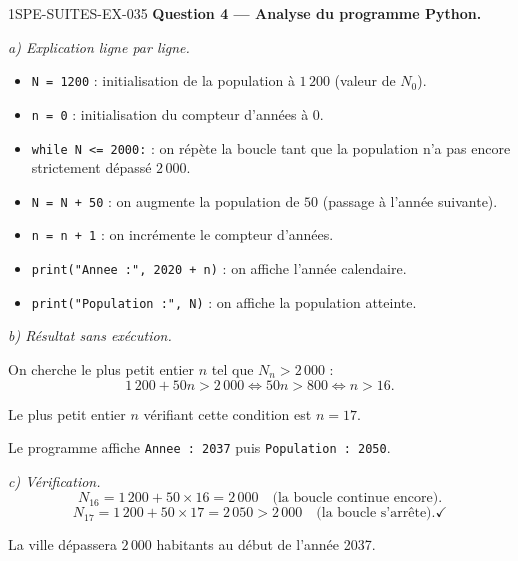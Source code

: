 \begin{corrige}{1SPE-SUITES-EX-035}
\medskip
\textbf{Question 4 — Analyse du programme Python.}

\textit{a) Explication ligne par ligne.}

\begin{itemize}
  \item \texttt{N = 1200} : initialisation de la population à $1\,200$ (valeur de $N_0$).
  \item \texttt{n = 0} : initialisation du compteur d'années à $0$.
  \item \texttt{while N <= 2000:} : on répète la boucle tant que la population n'a pas encore strictement dépassé $2\,000$.
  \item \texttt{N = N + 50} : on augmente la population de $50$ (passage à l'année suivante).
  \item \texttt{n = n + 1} : on incrémente le compteur d'années.
  \item \texttt{print("Annee :", 2020 + n)} : on affiche l'année calendaire.
  \item \texttt{print("Population :", N)} : on affiche la population atteinte.
\end{itemize}

\textit{b) Résultat sans exécution.}

On cherche le plus petit entier $n$ tel que $N_n > 2\,000$ :
\[
  1\,200 + 50n > 2\,000 \iff 50n > 800 \iff n > 16.
\]


Le plus petit entier $n$ vérifiant cette condition est $n = 17$.

Le programme affiche \texttt{Annee : 2037} puis \texttt{Population : 2050}.

\textit{c) Vérification.}
\[
  N_{16} = 1\,200 + 50 \times 16 = 2\,000 \quad \text{(la boucle continue encore)}.
\]
\[
  N_{17} = 1\,200 + 50 \times 17 = 2\,050 > 2\,000 \quad \text{(la boucle s'arrête)}. \checkmark
\]

La ville dépassera $2\,000$ habitants au début de l'année 2037.

\end{corrige}
